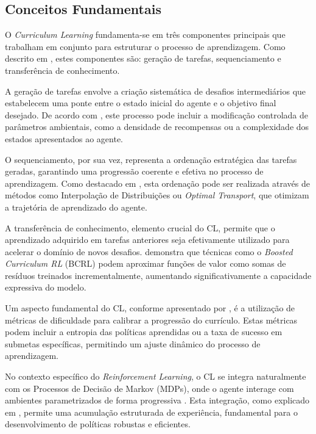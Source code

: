 \subsection{Conceitos Fundamentais}
\label{subsec:curriculum_conceitos}

O \textit{Curriculum Learning} fundamenta-se em três componentes principais que trabalham em conjunto para estruturar o processo de aprendizagem. Como descrito em \cite{curriculum}, estes componentes são: geração de tarefas, sequenciamento e transferência de conhecimento.

A geração de tarefas envolve a criação sistemática de desafios intermediários que estabelecem uma ponte entre o estado inicial do agente e o objetivo final desejado. De acordo com \cite{curriculum_reinforcement_learning}, este processo pode incluir a modificação controlada de parâmetros ambientais, como a densidade de recompensas ou a complexidade dos estados apresentados ao agente.

O sequenciamento, por sua vez, representa a ordenação estratégica das tarefas geradas, garantindo uma progressão coerente e efetiva no processo de aprendizagem. Como destacado em \cite{curriculum}, esta ordenação pode ser realizada através de métodos como Interpolação de Distribuições ou \textit{Optimal Transport}, que otimizam a trajetória de aprendizado do agente.

A transferência de conhecimento, elemento crucial do CL, permite que o aprendizado adquirido em tarefas anteriores seja efetivamente utilizado para acelerar o domínio de novos desafios. \cite{diffusion_based_curriculum_reinforcement_learning} demonstra que técnicas como o \textit{Boosted Curriculum RL} (BCRL) podem aproximar funções de valor como somas de resíduos treinados incrementalmente, aumentando significativamente a capacidade expressiva do modelo.

Um aspecto fundamental do CL, conforme apresentado por \cite{curriculum}, é a utilização de métricas de dificuldade para calibrar a progressão do currículo. Estas métricas podem incluir a entropia das políticas aprendidas ou a taxa de sucesso em submetas específicas, permitindo um ajuste dinâmico do processo de aprendizagem.

No contexto específico do \textit{Reinforcement Learning}, o CL se integra naturalmente com os Processos de Decisão de Markov (MDPs), onde o agente interage com ambientes parametrizados de forma progressiva \cite{sutton}. Esta integração, como explicado em \cite{curriculum_reinforcement_learning}, permite uma acumulação estruturada de experiência, fundamental para o desenvolvimento de políticas robustas e eficientes.

